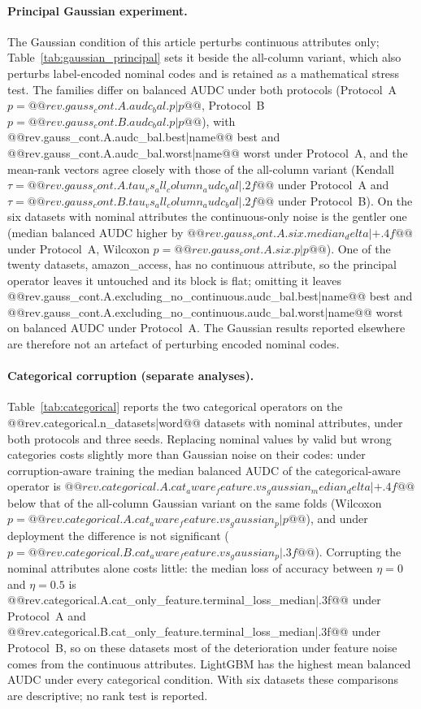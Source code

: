 \documentclass[pdflatex,sn-mathphys]{sn-jnl}
\theoremstyle{thmstyleone}
\theoremstyle{thmstyletwo}
\theoremstyle{thmstylethree}
\begin{document}
\paragraph{Principal Gaussian experiment.} The Gaussian condition of this article perturbs continuous attributes only; Table~\ref{tab:gaussian_principal} sets it beside the all-column variant, which also perturbs label-encoded nominal codes and is retained as a mathematical stress test. The families differ on balanced AUDC under both protocols (Protocol~A $p=@@{rev.gauss_cont.A.audc_bal.p|p}@@$, Protocol~B $p=@@{rev.gauss_cont.B.audc_bal.p|p}@@$), with @@{rev.gauss_cont.A.audc_bal.best|name}@@ best and @@{rev.gauss_cont.A.audc_bal.worst|name}@@ worst under Protocol~A, and the mean-rank vectors agree closely with those of the all-column variant (Kendall $\tau=@@{rev.gauss_cont.A.tau_vs_all_column_audc_bal|.2f}@@$ under Protocol~A and $\tau=@@{rev.gauss_cont.B.tau_vs_all_column_audc_bal|.2f}@@$ under Protocol~B). On the six datasets with nominal attributes the continuous-only noise is the gentler one (median balanced AUDC higher by $@@{rev.gauss_cont.A.six.median_delta|+.4f}@@$ under Protocol~A, Wilcoxon $p=@@{rev.gauss_cont.A.six.p|p}@@$). One of the twenty datasets, amazon\_access, has no continuous attribute, so the principal operator leaves it untouched and its block is flat; omitting it leaves @@{rev.gauss_cont.A.excluding_no_continuous.audc_bal.best|name}@@ best and @@{rev.gauss_cont.A.excluding_no_continuous.audc_bal.worst|name}@@ worst on balanced AUDC under Protocol~A. The Gaussian results reported elsewhere are therefore not an artefact of perturbing encoded nominal codes.



\paragraph{Categorical corruption (separate analyses).} Table~\ref{tab:categorical} reports the two categorical operators on the @@{rev.categorical.n_datasets|word}@@ datasets with nominal attributes, under both protocols and three seeds. Replacing nominal values by valid but wrong categories costs slightly more than Gaussian noise on their codes: under corruption-aware training the median balanced AUDC of the categorical-aware operator is $@@{rev.categorical.A.cat_aware_feature.vs_gaussian_median_delta|+.4f}@@$ below that of the all-column Gaussian variant on the same folds (Wilcoxon $p=@@{rev.categorical.A.cat_aware_feature.vs_gaussian_p|p}@@$), and under deployment the difference is not significant ($p=@@{rev.categorical.B.cat_aware_feature.vs_gaussian_p|.3f}@@$). Corrupting the nominal attributes alone costs little: the median loss of accuracy between $\eta=0$ and $\eta=0.5$ is @@{rev.categorical.A.cat_only_feature.terminal_loss_median|.3f}@@ under Protocol~A and @@{rev.categorical.B.cat_only_feature.terminal_loss_median|.3f}@@ under Protocol~B, so on these datasets most of the deterioration under feature noise comes from the continuous attributes. LightGBM has the highest mean balanced AUDC under every categorical condition. With six datasets these comparisons are descriptive; no rank test is reported.
\end{document}
